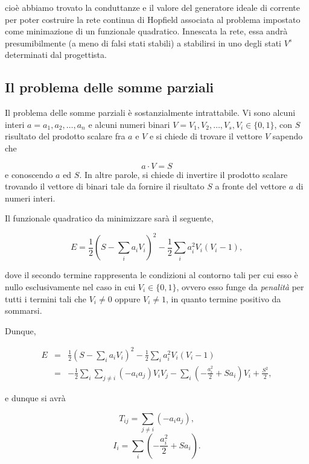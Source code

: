 \documentclass[10pt]{book}
\begin{document}
cioè abbiamo trovato la conduttanze e il valore del generatore ideale di
corrente per poter costruire la rete continua di Hopfield associata al
problema impostato come minimazione di un funzionale quadratico. Innescata la
rete, essa andrà presumibilmente (a meno di falsi stati stabili) a stabilirsi
in uno degli stati $V^s$ determinati dal progettista.

\subsection{Il problema delle somme parziali}

Il problema delle somme parziali è sostanzialmente intrattabile. Vi sono alcuni
interi $a = a_1, a_2, \dots, a_n$ e alcuni numeri binari $ V = V_1, V_2, \dots,
V_s, V_i \in \{0,1\}$, con $S$ risultato del prodotto scalare fra $a$ e $V$ e
si chiede di trovare il vettore $V$ sapendo che

$$a \cdot V = S$$ e conoscendo $a$ ed $S$. In altre parole, si chiede di
invertire il prodotto scalare trovando il vettore di binari tale da fornire il
risultato $S$ a fronte del vettore $a$ di numeri interi.

Il funzionale quadratico da minimizzare sarà il seguente,


\begin{equation}
    E = \frac 1 2 (S - \sum_i a_i V_i)^2 - \frac 1 2 \sum_i a_i^2 V_i(V_i - 1),
\end{equation}

dove il secondo termine rappresenta le condizioni al contorno tali per cui esso
è nullo esclusivamente nel caso in cui $V_i \in \{0,1\}$, ovvero esso funge da
\emph{penalità} per tutti i termini tali che $V_i \neq 0$ oppure $V_i \neq 1$,
in quanto termine positivo da sommarsi.

Dunque,

\begin{eqnarray}\nonumber
    E & = & \frac 1 2 (S - \sum_i a_i V_i)^2 - \frac 1 2 \sum_i a_i^2 V_i(V_i - 1) \\\nonumber
      & = & -\frac 1 2 \sum_i \sum_{j \neq i} (-a_i a_j) V_i V_j - \sum_i(-\frac{a_i^2}{2} + Sa_i)V_i + \frac{S^2}{2},
\end{eqnarray}

e dunque si avrà

$$T_{ij} = \sum_{j\neq i} (-a_i a_j),$$
$$I_i = \sum_i (-\frac{a_i^2}{2} + Sa_i).$$
\end{document}
